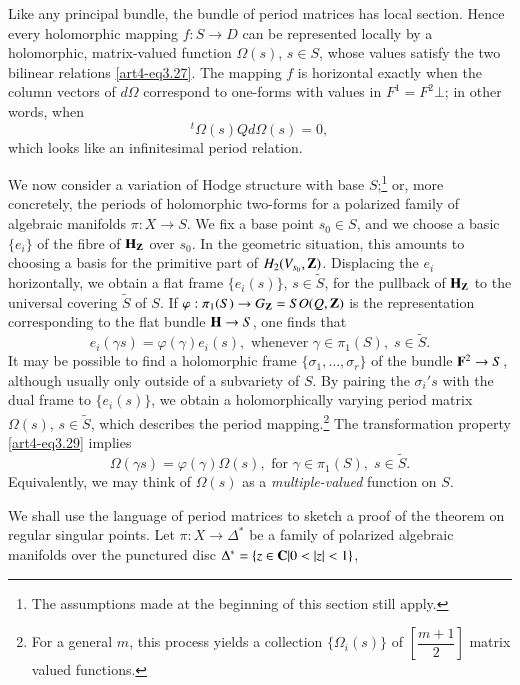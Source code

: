 Like any principal bundle, the bundle of period matrices has local section. Hence every holomorphic mapping $f : S \to D$ can be represented locally by a holomorphic, matrix-valued function $\Omega(s)$, $s \in S$, whose values satisfy the two bilinear relations \eqref{art4-eq3.27}. The mapping $f$ is horizontal exactly when the column vectors of $d \Omega$ correspond to one-forms with values in $F^1 = F^2 \bot$; in other words, when
\begin{equation}
{}^t \Omega (s) Q d \Omega (s) = 0,
\label{art4-eq3.28}
\end{equation}
which looks like an infinitesimal period relation.

We now consider a variation of Hodge structure with base $S$;\footnote[15]{The assumptions made at the beginning of this section still apply.} or, more concretely, the periods of holomorphic two-forms for a polarized family of algebraic manifolds $\pi: X \to S$. We fix a base point $s_0 \in S$, and we choose a basic $\{e_i\}$ of the fibre of $\mathbf{H}_{\mathbf{Z}}$ over $s_0$. In the geometric situation, this amounts to choosing a basis for the primitive part of $H_2 (V_{s_0}, \mathbf{Z})$. Displacing the $e_i$ horizontally, we obtain a flat frame $\{e_i(s)\}$, $s \in \tilde{S}$, for the pullback of $\mathbf{H}_{\mathbf{Z}}$ to the universal covering $\tilde{S}$ of $S$. If $\varphi : \pi_1 (S) \to G_{\mathbf{Z}} = SO (Q, \mathbf{Z})$ is the representation corresponding to the flat bundle $\mathbf{H} \to S$, one finds that 
\begin{equation}
e_i (\gamma s ) = \varphi (\gamma) e_i (s), \text{ whenever } \gamma \in \pi_1 (S), \; s \in \tilde{S}. 
\label{art4-eq3.29}
\end{equation}
It may be possible to find a holomorphic frame $\{\sigma_1, \ldots, \sigma_r\}$ of the bundle $\mathbf{F}^2 \to S$, although usually only outside of a subvariety of $S$. By pairing the $\sigma_i's$ with the dual frame to $\{e_i (s)\}$, we obtain a holomorphically varying period matrix $\Omega (s)$, $s \in \tilde{S}$, which describes the period mapping.\footnote[16]{For a general $m$, this process yields a collection $\{\Omega_i (s)\}$ of $\left[\dfrac{m+1}{2}\right]$ matrix valued functions.} The transformation property \eqref{art4-eq3.29} implies 
\begin{equation}
\Omega (\gamma s) = \varphi (\gamma) \Omega (s), \text{ for } \gamma \in \pi_1 (S), \; s \in \tilde{S}.  \label{art4-eq3.30}
\end{equation}
Equivalently, we may think of $\Omega (s)$ as a \textit{multiple-valued} function on $S$.

We shall use the language of period matrices to sketch a proof of the theorem on regular singular points. Let $\pi : X \to \Delta^\ast$  be a family of polarized algebraic manifolds over the punctured disc $\Delta^\ast = \{z \in \mathbf{C} | 0 < |z| < 1\}$, 







\begin{thebibliography}{99}
\end{thebibliography}





